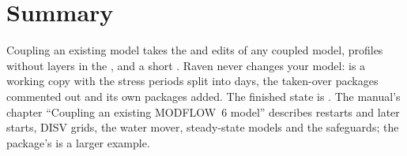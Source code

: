\section{Summary}
Coupling an existing model takes the  and  edits of any coupled model, profiles without layers in the
, and a short . Raven never changes your model:  is a working copy with the stress periods
split into days, the taken-over packages commented out and its own packages added. The finished state is
. The manual's chapter ``Coupling an existing MODFLOW~6 model'' describes restarts
and later starts, DISV grids, the water mover, steady-state models and the safeguards; the package's
 is a larger example.
